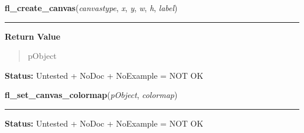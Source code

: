     \label{xformslib:library:fl_create_canvas}

    \vspace{0.5ex}

\hspace{.8\funcindent}\begin{boxedminipage}{\funcwidth}

    \raggedright \textbf{fl\_create\_canvas}(\textit{canvastype}, \textit{x}, \textit{y}, \textit{w}, \textit{h}, \textit{label})

    \vspace{-1.5ex}

    \rule{\textwidth}{0.5\fboxrule}
\setlength{\parskip}{2ex}
\setlength{\parskip}{1ex}
      \textbf{Return Value}
    \vspace{-1ex}

      \begin{quote}
      pObject

      \end{quote}

\textbf{Status:} Untested + NoDoc + NoExample = NOT OK



    \end{boxedminipage}

    \label{xformslib:library:fl_set_canvas_colormap}

    \vspace{0.5ex}

\hspace{.8\funcindent}\begin{boxedminipage}{\funcwidth}

    \raggedright \textbf{fl\_set\_canvas\_colormap}(\textit{pObject}, \textit{colormap})

    \vspace{-1.5ex}

    \rule{\textwidth}{0.5\fboxrule}
\setlength{\parskip}{2ex}
\setlength{\parskip}{1ex}
\textbf{Status:} Untested + NoDoc + NoExample = NOT OK



    \end{boxedminipage}

    \label{xformslib:library:fl_set_canvas_visual}

